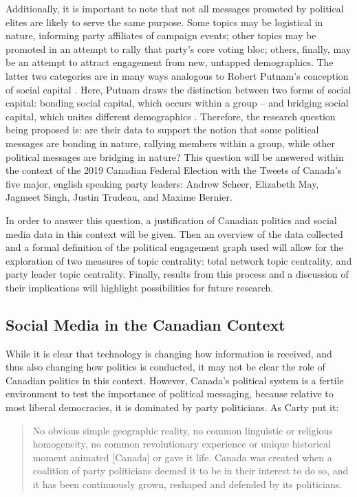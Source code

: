 \documentclass{nws}
\begin{document}
Additionally, it is important to note that not all messages promoted by
political elites are likely to serve the same purpose. Some topics may be
logistical in nature, informing party affiliates of campaign events; other
topics may be promoted in an attempt to rally that party's core voting bloc;
others, finally, may be an attempt to attract
engagement from new, untapped demographics. The latter two categories are in
many ways analogous to Robert Putnam's conception of social capital
\cite{putnam2001social}. Here, Putnam draws the distinction between two forms
of social capital: bonding social capital, which occurs within a group -- and
bridging social capital, which unites different demographics
\cite{putnam2001social}. Therefore, the research question being proposed is:
are their data to support the notion that some political messages are bonding in
nature, rallying members within a group, while other political messages are
bridging in nature? This question will be answered within the context of the
2019 Canadian Federal Election with the Tweets of Canada’s five major, english
speaking party leaders: Andrew Scheer, Elizabeth May, Jagmeet Singh, Justin
Trudeau, and Maxime Bernier. 

In order to answer this question, a justification of Canadian politics and
social media data in this context will be given. Then an overview of the data
collected and a formal definition of the political engagement graph used will
allow for the exploration of two measures of topic centrality: total network
topic centrality, and party leader topic centrality. Finally, results from this
process and a discussion of their implications will highlight possibilities for
future research.  

\subsection{Social Media in the Canadian Context}

While it is clear that technology is changing how information is received, and
thus also changing how politics is conducted, it may not be clear the role of
Canadian politics in this context. However, Canada’s political system is a
fertile environment to test the importance of political messaging, because
relative to most liberal democracies, it is dominated by party
politicians. As Carty put it: 

\begin{quote}
  No obvious simple geographic reality, no common linguistic or religious
  homogeneity, no common revolutionary experience or unique historical moment
  animated [Canada] or gave it life. Canada was created when a coalition of party
  politicians deemed it to be in their interest to do so, and it has been
  continuously grown, reshaped and defended by its politicians.\cite{carty2010political}
\end{quote}
\end{document}
